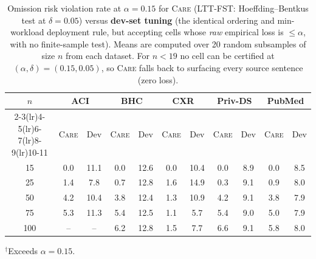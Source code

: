 \begin{table}[t]
\centering
\small
\setlength{\tabcolsep}{4pt}
\caption{Omission risk violation rate at $\alpha = 0.15$ for \textsc{Care} (LTT-FST: Hoeffding--Bentkus test at $\delta=0.05$) versus \textbf{dev-set tuning} (the identical ordering and min-workload deployment rule, but accepting cells whose \emph{raw} empirical loss is $\le\alpha$, with no finite-sample test). Means are computed over 20 random subsamples of size $n$ from each dataset. For $n<19$ no cell can be certified at $(\alpha,\delta)=(0.15,0.05)$, so \textsc{Care} falls back to surfacing every source sentence (zero loss).}
\label{tab:crc-vs-devset}
\begin{tabular}{c cc cc cc cc cc }
\toprule
$n$ & \multicolumn{2}{c}{ACI} & \multicolumn{2}{c}{BHC} & \multicolumn{2}{c}{CXR} & \multicolumn{2}{c}{Priv-DS} & \multicolumn{2}{c}{PubMed} \\
\cmidrule(lr){2-3}\cmidrule(lr){4-5}\cmidrule(lr){6-7}\cmidrule(lr){8-9}\cmidrule(lr){10-11}
 & \textsc{Care} & Dev & \textsc{Care} & Dev & \textsc{Care} & Dev & \textsc{Care} & Dev & \textsc{Care} & Dev \\
\midrule
15 & 0.0 & 11.1 & 0.0 & 12.6 & 0.0 & 10.4 & 0.0 & 8.9 & 0.0 & 8.5 \\
25 & 1.4 & 7.8 & 0.7 & 12.8 & 1.6 & 14.9 & 0.3 & 9.1 & 0.9 & 8.0 \\
50 & 4.2 & 10.4 & 3.8 & 12.4 & 1.3 & 10.9 & 4.2 & 9.1 & 3.8 & 7.9 \\
75 & 5.3 & 11.3 & 5.4 & 12.5 & 1.1 & 5.7 & 5.4 & 9.0 & 5.0 & 7.9 \\
100 & -- & -- & 6.2 & 12.8 & 1.5 & 7.7 & 6.6 & 9.1 & 5.8 & 8.0 \\
\bottomrule
\end{tabular}
\vspace{2pt}
\par\small $^\dagger$Exceeds $\alpha=0.15$.
\end{table}